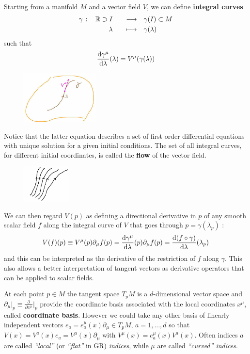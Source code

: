 \documentclass[../main/main.tex]{subfiles}
\begin{document}
\begin{definition}{}
Starting from a manifold $M$ and a vector field $V$, we can define \textbf{integral curves}
\begin{alignat*}{4}
\gamma\,:\,&&\mathbb{R}\supset I&&\quad\longrightarrow\quad&\gamma(I)\subset M\\
&&\lambda&&\quad\longmapsto\quad &\gamma(\lambda)
\end{alignat*}
such that
\[\frac{\textup{d} \gamma^\mu}{\textup{d}\lambda}(\lambda)=V^\mu(\gamma(\lambda))\]
\begin{figure}[H]
\centering
\includegraphics[width=4cm]{../img/integral-curve.jpg}
\end{figure}
\noindent Notice that the latter equation describes a set of first order differential equations with unique solution for a given initial conditions. The set of all integral curves, for different initial coordinates, is called the \textbf{flow} of the vector field.
\begin{figure}[H]
\centering
\includegraphics[width=2.5cm]{../img/flow-vector-field.jpg}
\end{figure}
\noindent We can then regard $V(p)$ as defining a directional derivative in $p$ of any smooth scalar field $f$ along the integral curve of $V$ that goes through $p=\gamma(\lambda_p)$ :
\[V(f)(p)\equiv V^\mu(p)\partial_\mu f(p)=\frac{\textup{d} \gamma^\mu}{\textup{d}\lambda}(p)\partial_\mu f(p)=\frac{\textup{d} (f\circ\gamma)}{\textup{d}\lambda}(\lambda_p)\]
and this can be interpreted as the derivative of the restriction of $f$ along $\gamma$. This also allows a better interpretation of tangent vectors as derivative operators that can be applied to scalar fields. 

At each point $p\in M$ the tangent space $T_pM$ is a $d$-dimensional vector space and $\partial_\mu\big\vert_p\equiv\frac\partial{\partial x^\mu}\big\vert_p$ provide the coordinate basis associated with the local coordinates $x^\mu$, called \textbf{coordinate basis}. However we could take any other basis of linearly independent vectors $e_a=e_a^\mu(x)\partial_\mu\in T_pM$, $a=1,\dots,d$ so that $V(x)=V^a(x)e_a=V^\mu(x)\partial_\mu$ with $V^\mu(x)=e_a^\mu(x)V^a(x)$. Often indices $a$ are called \emph{``local''} (or \emph{``flat''} in GR) \emph{indices}, while $\mu$ are called \emph{``curved'' indices}.


\end{definition}
\end{document}
